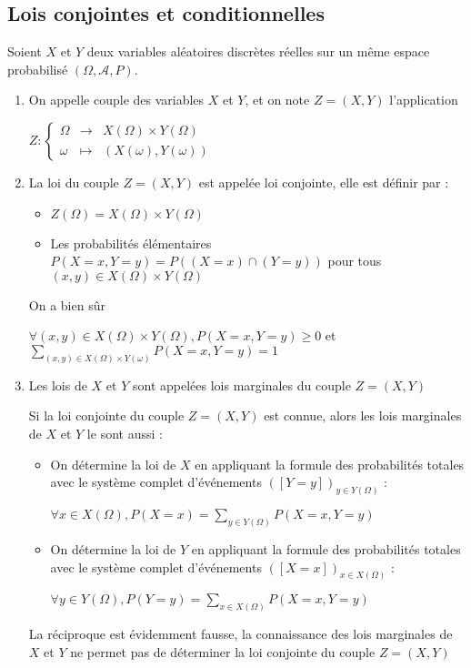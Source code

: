 \documentclass[a4paper,12pt]{book}
\newcommand{\Def}[2]{\begin{tcolorbox}[colback=white,colframe=red!10!green!20!blue!75!, title=Définition : #1]#2\end{tcolorbox}}
\begin{document}
\subsection{Lois conjointes et conditionnelles}
\Def{}{Soient $X$ et $Y$ deux variables aléatoires discrètes réelles sur un même espace probabilisé $(\Omega, \mathcal{A},P)$.\begin{enumerate}
\item On appelle couple des variables $X$ et $Y$, et on note $Z=(X,Y)$ l'application \par\begin{center}$Z:\left\{\begin{array}{rcl}\Omega & \to & X(\Omega)\times Y(\Omega) \\ \omega & \mapsto & (X(\omega), Y(\omega)) \end{array}\right.$\end{center}
\item La loi du couple $Z=(X,Y)$ est appelée loi conjointe, elle est définir par :\begin{itemize}
    \item $Z(\Omega)=X(\Omega)\times Y(\Omega)$
    \item Les probabilités élémentaires $P(X=x, Y=y)=P((X=x)\cap(Y=y))$ pour tous $(x,y)\in X(\Omega)\times Y(\Omega)$
\end{itemize} On a bien sûr \par\begin{center}$\forall (x,y)\in X(\Omega)\times Y(\Omega), P(X=x,Y=y)\geq 0$ et $\sum\limits_{(x,y)\in X(\Omega)\times Y(\omega)}P(X=x,Y=y)=1$\end{center}
\item Les lois de $X$ et $Y$ sont appelées lois marginales du couple $Z=(X,Y)$
\par Si la loi conjointe du couple $Z=(X,Y)$ est connue, alors les lois marginales de $X$ et $Y$ le sont aussi :\begin{itemize}
    \item On détermine la loi de $X$ en appliquant la formule des probabilités totales avec le système complet d'événements $([Y=y])_{y\in Y(\Omega)}$ :
    \par\begin{center}$\forall x\in X(\Omega), P(X=x)=\sum\limits_{y\in Y(\Omega)}P(X=x, Y=y)$\end{center}
    \item On détermine la loi de $Y$ en appliquant la formule des probabilités totales avec le système complet d'événements $([X=x])_{x\in X(\Omega)}$ :
    \par\begin{center}$\forall y\in Y(\Omega), P(Y=y)=\sum\limits_{x\in X(\Omega)}P(X=x, Y=y)$\end{center}
\end{itemize} La réciproque est évidemment fausse, la connaissance des lois marginales de $X$ et $Y$ ne permet pas de déterminer la loi conjointe du couple $Z=(X,Y)$
\end{enumerate}}
\end{document}

